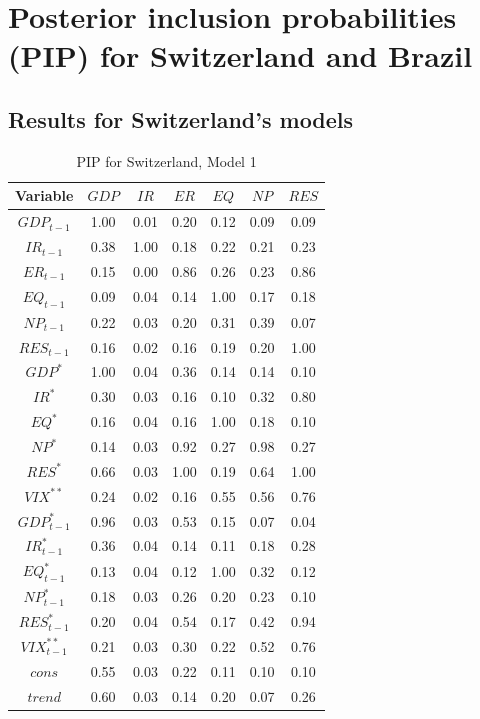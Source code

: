 \documentclass[a4paper, twoside]{templates/ociamthesis}
\begin{document}
\hypertarget{appendixdPIPCHBR}{%
\section{Posterior inclusion probabilities (PIP) for Switzerland and Brazil}\label{appendixdPIPCHBR}}

\hypertarget{appendixdPIPCH}{%
\subsection{Results for Switzerland's models}\label{appendixdPIPCH}}

\begin{table}[!ht]

\caption{\label{tab:TablePIPCH1}PIP for Switzerland, Model 1}
\centering
\fontsize{8}{10}\selectfont
\begin{tabular}[t]{ccccccc}
\toprule
Variable & $GDP$ & $IR$ & $ER$ & $EQ$ & $NP$ & $RES$\\
\midrule
$GDP_{t-1}$ & 1.00 & 0.01 & 0.20 & 0.12 & 0.09 & 0.09\\
$IR_{t-1}$ & 0.38 & 1.00 & 0.18 & 0.22 & 0.21 & 0.23\\
$ER_{t-1}$ & 0.15 & 0.00 & 0.86 & 0.26 & 0.23 & 0.86\\
$EQ_{t-1}$ & 0.09 & 0.04 & 0.14 & 1.00 & 0.17 & 0.18\\
$NP_{t-1}$ & 0.22 & 0.03 & 0.20 & 0.31 & 0.39 & 0.07\\
$RES_{t-1}$ & 0.16 & 0.02 & 0.16 & 0.19 & 0.20 & 1.00\\
$GDP^*$ & 1.00 & 0.04 & 0.36 & 0.14 & 0.14 & 0.10\\
$IR^*$ & 0.30 & 0.03 & 0.16 & 0.10 & 0.32 & 0.80\\
$EQ^*$ & 0.16 & 0.04 & 0.16 & 1.00 & 0.18 & 0.10\\
$NP^*$ & 0.14 & 0.03 & 0.92 & 0.27 & 0.98 & 0.27\\
$RES^*$ & 0.66 & 0.03 & 1.00 & 0.19 & 0.64 & 1.00\\
$VIX^{**}$ & 0.24 & 0.02 & 0.16 & 0.55 & 0.56 & 0.76\\
$GDP^*_{t-1}$ & 0.96 & 0.03 & 0.53 & 0.15 & 0.07 & 0.04\\
$IR^*_{t-1}$ & 0.36 & 0.04 & 0.14 & 0.11 & 0.18 & 0.28\\
$EQ^*_{t-1}$ & 0.13 & 0.04 & 0.12 & 1.00 & 0.32 & 0.12\\
$NP^*_{t-1}$ & 0.18 & 0.03 & 0.26 & 0.20 & 0.23 & 0.10\\
$RES^*_{t-1}$ & 0.20 & 0.04 & 0.54 & 0.17 & 0.42 & 0.94\\
$VIX^{**}_{t-1}$ & 0.21 & 0.03 & 0.30 & 0.22 & 0.52 & 0.76\\
$cons$ & 0.55 & 0.03 & 0.22 & 0.11 & 0.10 & 0.10\\
$trend$ & 0.60 & 0.03 & 0.14 & 0.20 & 0.07 & 0.26\\
\bottomrule
\end{tabular}
\end{table}
\end{document}
